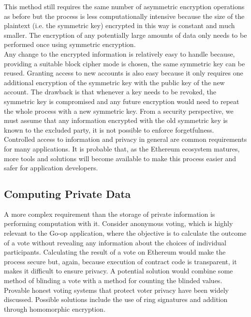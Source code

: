 This method still requires the same number of asymmetric encryption operations as before but the process is less computationally intensive because the size of the plaintext (i.e. the symmetric key) encrypted in this way is constant and much smaller. The encryption of any potentially large amounts of data only needs to be performed once using symmetric encryption.\\

Any change to the encrypted information is relatively easy to handle because, providing a suitable block cipher mode is chosen, the same symmetric key can be reused. Granting access to new accounts is also easy because it only requires one additional encryption of the symmetric key with the public key of the new account. The drawback is that whenever a key needs to be revoked, the symmetric key is compromised and any future encryption would need to repeat the whole process with a new symmetric key. From a security perspective, we must assume that any information encrypted with the old symmetric key is known to the excluded party, it is not possible to enforce forgetfulness. \\

Controlled access to information and privacy in general are common requirements for many applications. It is probable that, as the Ethereum ecosystem matures, more tools and solutions will become available to make this process easier and safer for application developers. \\

\subsection{Computing Private Data}
A more complex requirement than the storage of private information is performing computation with it. Consider anonymous voting, which is highly relevant to the Go-op application, where the objective is to calculate the outcome of a vote without revealing any information about the choices of individual participants. Calculating the result of a vote on Ethereum would make the process secure but, again, because execution of contract code is transparent, it makes it difficult to ensure privacy. A potential solution would combine some method of blinding a vote with a method for counting the blinded values.\\

Provable honest voting systems that protect voter privacy have been widely discussed\cite{PrivacyBlockchain}\cite{HonestElection}. Possible solutions include the use of ring signatures\cite{liu2004linkable}\cite{tsang2005short} and addition through homomorphic encryption\cite{HomoEncryption}.\\

